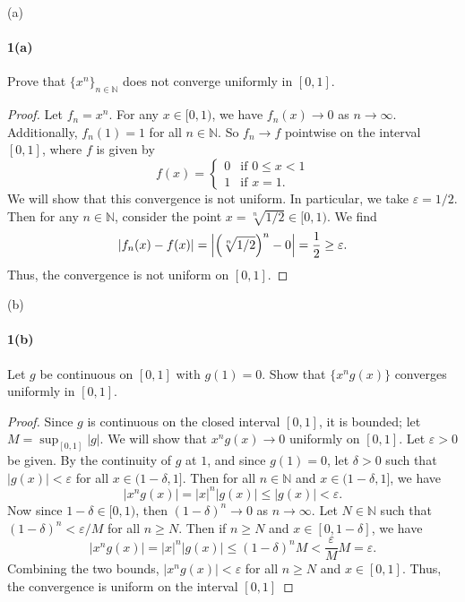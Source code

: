 \documentclass[12pt]{article}
\newenvironment{fullbox}{\begin{lrbox}{\savefullbox}\begin{minipage}{\dimexpr\textwidth-2\fboxsep\relax}}{\end{minipage}\end{lrbox}\begin{center}\framebox[\textwidth]{\usebox{\savefullbox}}\end{center}}
\newenvironment{pbox}[1][]{\begin{fullbox}\ifx#1\empty\else\paragraph{#1}\fi}{\end{fullbox}}
\theoremstyle{definition}
\newcommand{\N}{\mathbb{N}}
\newcommand{\eps}{\varepsilon}
\begin{document}
\thispagestyle{title}


\begin{pbox}[1(a)]
    Prove that $\{x^n\}_{n\in \mathbb{N}}$ does not converge uniformly in $[0,1]$.
\end{pbox}

\begin{proof}
    Let $f_n = x^n$. For any $x \in [0, 1)$, we have $f_n(x) \to 0$ as $n \to \infty$. Additionally, $f_n(1) = 1$ for all $n \in \N$. So $f_n \to f$ pointwise on the interval $[0, 1]$, where $f$ is given by
    \[
        f(x) = \begin{cases}
            0 &\text{if } 0 \leq x < 1 \\
            1 &\text{if } x = 1.
        \end{cases}
    \]
    We will show that this convergence is not uniform. In particular, we take $\eps = 1/2$. Then for any $n \in \N$, consider the point $x = \sqrt[n]{1/2} \in [0, 1)$. We find
    \[
        |f_n(x) - f(x)|
            = \abs{\qty(\sqrt[n]{1/2})^n - 0}
            = \frac{1}{2}
            \geq \eps.
    \]
    Thus, the convergence is not uniform on $[0, 1]$.
    
\end{proof}

\begin{pbox}[1(b)]
    Let $g$ be continuous on $[0,1]$ with $g(1) = 0$. Show that $\{x^ng(x)\}$ converges uniformly in $[0,1]$. 
\end{pbox}

\begin{proof}
    Since $g$ is continuous on the closed interval $[0, 1]$, it is bounded; let $M = \sup_{[0, 1]}|g|$. We will show that $x^ng(x) \to 0$ uniformly on $[0, 1]$. Let $\eps > 0$ be given. By the continuity of $g$ at $1$, and since $g(1) = 0$, let $\delta > 0$ such that $|g(x)| < \eps$ for all $x \in (1 - \delta, 1]$. Then for all $n \in \N$ and $x \in (1 - \delta, 1]$, we have
    \[
        |x^ng(x)| = |x|^n|g(x)| \leq |g(x)| < \eps.
    \]
    Now since $1 - \delta \in [0, 1)$, then $(1 - \delta)^n \to 0$ as $n \to \infty$. Let $N \in \N$ such that $(1- \delta)^n < \eps/M$ for all $n \geq N$. Then if $n \geq N$ and $x \in [0, 1-\delta]$, we have
    \[
        |x^ng(x)| = |x|^n|g(x)| \leq (1-\delta)^nM < \frac{\eps}{M}M = \eps.
    \]
    Combining the two bounds, $|x^ng(x)| < \eps$ for all $n \geq N$ and $x \in [0, 1]$. Thus, the convergence is uniform on the interval $[0, 1]$
    
\end{proof}
    
\end{document}
